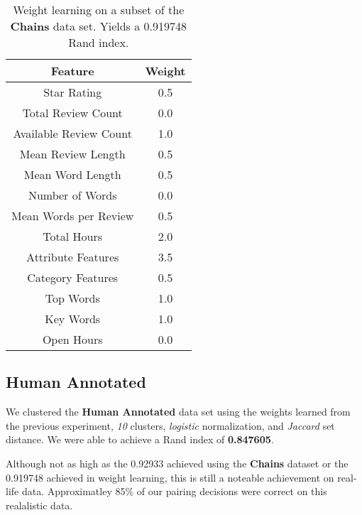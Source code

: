 \documentclass{article}
\begin{document}
      \begin{table}
         \begin{center}
            \begin{tabular}{| c | c |}
               \hline
                  Feature & Weight \\
               \hline
                  Star Rating & 0.5 \\
                  Total Review Count & 0.0 \\
                  Available Review Count & 1.0 \\
                  Mean Review Length & 0.5 \\
                  Mean Word Length & 0.5 \\
                  Number of Words & 0.0 \\
                  Mean Words per Review & 0.5 \\
                  Total Hours & 2.0 \\
                  Attribute Features & 3.5 \\
                  Category Features & 0.5 \\
                  Top Words & 1.0 \\
                  Key Words & 1.0 \\
                  Open Hours & 0.0 \\
               \hline
            \end{tabular}
            \caption{Weight learning on a subset of the \textbf{Chains} data set. Yields a 0.919748 Rand index.}
            \label{tab:weight-learning}
         \end{center}
      \end{table}

   \subsection{Human Annotated}
      We clustered the \textbf{Human Annotated} data set using the weights learned from the previous experiment, \textit{10} clusters, \textit{logistic} normalization, and \textit{Jaccard} set distance.
      We were able to achieve a Rand index of \textbf{0.847605}.

      Although not as high as the 0.92933 achieved using the \textbf{Chains} dataset or the 0.919748 achieved in weight learning, this is still a noteable achievement on real-life data.
      Approximatley 85\% of our pairing decisions were correct on this realalistic data.
\end{document}
